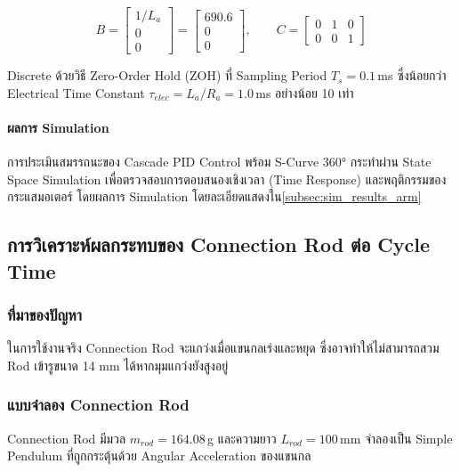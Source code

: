 \begin{equation}
  B = \begin{bmatrix} 1/L_a \\ 0 \\ 0 \end{bmatrix}
    = \begin{bmatrix} 690.6 \\ 0 \\ 0 \end{bmatrix}, \qquad
  C = \begin{bmatrix} 0 & 1 & 0 \\ 0 & 0 & 1 \end{bmatrix}
  \label{eq:BC_matrix}
\end{equation}

Discrete ด้วยวิธี Zero-Order Hold (ZOH) ที่ Sampling Period $T_s = 0.1$\,ms
ซึ่งน้อยกว่า Electrical Time Constant $\tau_{elec} = L_a/R_a = 1.0$\,ms อย่างน้อย 10 เท่า

\paragraph{ผลการ Simulation}

การประเมินสมรรถนะของ Cascade PID Control พร้อม S-Curve 360° กระทำผ่าน State Space Simulation เพื่อตรวจสอบการตอบสนองเชิงเวลา (Time Response) และพฤติกรรมของกระแสมอเตอร์ โดยผลการ Simulation โดยละเอียดแสดงใน\cref{subsec:sim_results_arm}

\subsection{การวิเคราะห์ผลกระทบของ Connection Rod ต่อ Cycle Time}
\label{subsec:rod_effect_analysis}

\subsubsection{ที่มาของปัญหา}
\label{subsubsec:problem_origin}

ในการใช้งานจริง Connection Rod จะแกว่งเมื่อแขนกลเร่งและหยุด ซึ่งอาจทำให้ไม่สามารถสวม Rod เข้ารูขนาด 14 mm ได้หากมุมแกว่งยังสูงอยู่

\subsubsection{แบบจำลอง Connection Rod}
\label{subsubsec:connection_rod_modeling}

Connection Rod มีมวล $m_{rod} = 164.08$\,g และความยาว $L_{rod} = 100$\,mm จำลองเป็น Simple Pendulum ที่ถูกกระตุ้นด้วย Angular Acceleration ของแขนกล

